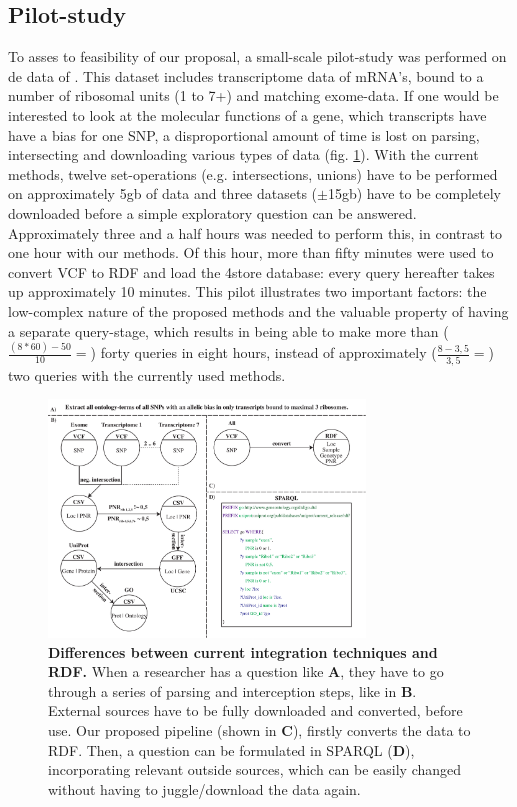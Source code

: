 \documentclass[twoside,fontsize=10pt]{article}
\begin{document}
\subsection*{Pilot-study}
To asses to feasibility of our proposal, a small-scale pilot-study was performed on de data of \citet{VanHeesch2014}. This dataset includes transcriptome data of mRNA's, bound to a number of ribosomal units (1 to 7+) and matching exome-data. If one would be interested to look at the molecular functions of a gene, which transcripts have have a bias for one SNP, a disproportional amount of time is lost on parsing, intersecting and downloading various types of data (fig. \ref{fig:awesome_image}). With the current methods, twelve set-operations (e.g. intersections, unions) have to be performed on approximately 5gb of data and three datasets ($\pm$15gb) have to be completely downloaded before a simple exploratory question can be answered. Approximately three and a half hours was needed to perform this, in contrast to one hour with our methods. Of this hour, more than fifty minutes were used to convert VCF to RDF and load the 4store database: every query hereafter takes up approximately 10 minutes. This pilot illustrates two important factors: the low-complex nature of the proposed methods and the valuable property of having a separate query-stage, which results in being able to make more than ($\frac{(8*60)-50}{10}= $) forty queries in eight hours, instead of approximately ($\frac{8-3,5}{3,5}= $) two queries with the currently used methods.

\begin{figure}[H]
    \centering
    \includegraphics[width=0.75\textwidth]{DifferencesInDoingThings}
    \caption{\textbf{Differences between current integration techniques and RDF.} When a researcher has a question like \textbf{A}, they have to go through a series of parsing and interception steps, like in \textbf{B}. External sources have to be fully downloaded and converted, before use. Our proposed pipeline (shown in \textbf{C}), firstly converts the data to RDF. Then, a question can be formulated in SPARQL (\textbf{D}), incorporating relevant outside sources, which can be easily changed without having to juggle/download the data again.}
    \label{fig:awesome_image}
\end{figure}
\end{document}
